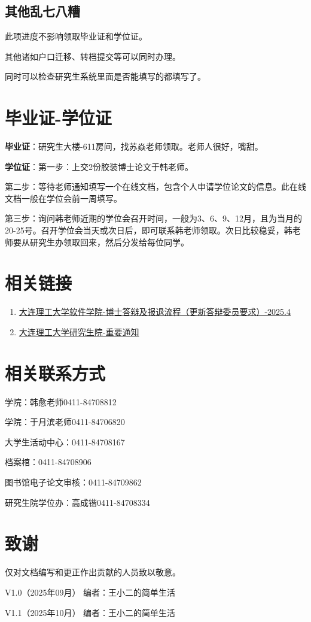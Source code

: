 \documentclass[12pt,a4paper]{ctexart}
\begin{document}
\subsection{其他乱七八糟}
\label{sec:luanbaqizao}

此项进度不影响领取毕业证和学位证。

其他诸如户口迁移、转档提交等可以同时办理。

同时可以检查研究生系统里面是否能填写的都填写了。

  \section{毕业证-学位证}
\label{sec:certi}

\textbf{毕业证}：研究生大楼-611房间，找苏焱老师领取。老师人很好，嘴甜。


\textbf{学位证}：第一步：上交2份胶装博士论文于韩老师。

第二步：等待老师通知填写一个在线文档，包含个人申请学位论文的信息。此在线文档一般在学位会前一周填写。

第三步：询问韩老师近期的学位会召开时间，一般为3、6、9、12月，且为当月的20-25号。召开学位会当天或次日后，即可联系韩老师领取。次日比较稳妥，韩老师要从研究生办领取回来，然后分发给每位同学。



\section{相关链接}
\label{sec:UsedLinks}
\begin{enumerate}
\item \href{https://ss.dlut.edu.cn/info/1341/24831.htm}{大连理工大学软件学院-博士答辩及报退流程（更新答辩委员要求）-2025.4}
  \item \href{https://gs.dlut.edu.cn/yjspy/pygcguan_li/zytz.htm}{大连理工大学研究生院-重要通知}
\end{enumerate}


\section{相关联系方式}
\label{sec:contact}

学院：韩愈老师0411-84708812

学院：于月滨老师0411-84706820

大学生活动中心：0411-84708167

档案棺：0411-84708906

图书馆电子论文审核：0411-84709862

研究生院学位办：高成锴0411-84708334

\section{致谢}
\label{sec:ack}

仅对文档编写和更正作出贡献的人员致以敬意。

V1.0（2025年09月） \hspace{2cm}编者：王小二的简单生活

V1.1（2025年10月） \hspace{2cm}编者：王小二的简单生活
\end{document}
